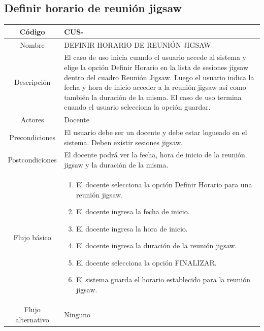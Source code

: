 \subsection{Definir horario de reunión jigsaw}
\begin{longtable}{|c|L{10cm}|}
	\toprule[0.8mm]
	Código &  CUS-\casodeuso\\  \midrule
	Nombre &  DEFINIR HORARIO DE REUNIÓN JIGSAW\\  \midrule
	Descripción & El caso de uso inicia cuando el usuario accede al sistema y elige la opción Definir Horario en la lista de sesiones jigsaw dentro del cuadro Reunión Jigsaw. Luego el usuario indica la fecha y hora de inicio acceder a la reunión jigsaw así como también la duración de la misma. El caso de uso termina cuando el usuario selecciona la opción guardar. \\  \midrule
	Actores &  Docente\\  \midrule
	Precondiciones & El usuario debe ser un docente y debe estar logueado en el sistema. Deben existir sesiones jigsaw. \\  \midrule
	Postcondiciones & El docente podrá ver la fecha, hora de inicio de la reunión jigsaw y la duración de la misma. \\  \midrule
	Flujo básico & \begin{enumerate}
		\item El docente selecciona la opción Definir Horario para una reunión jigsaw.
		\item El docente ingresa la fecha de inicio.
		\item El docente ingresa la hora de inicio.
		\item El docente ingresa la duración de la reunión jigsaw.
		\item El docente selecciona la opción FINALIZAR.
		\item El sistema guarda el horario establecido para la reunión jigsaw.
	\end{enumerate}
	\\  \midrule
	Flujo alternativo & Ninguno \\  \bottomrule[0.8mm]
\end{longtable}
\clearpage
